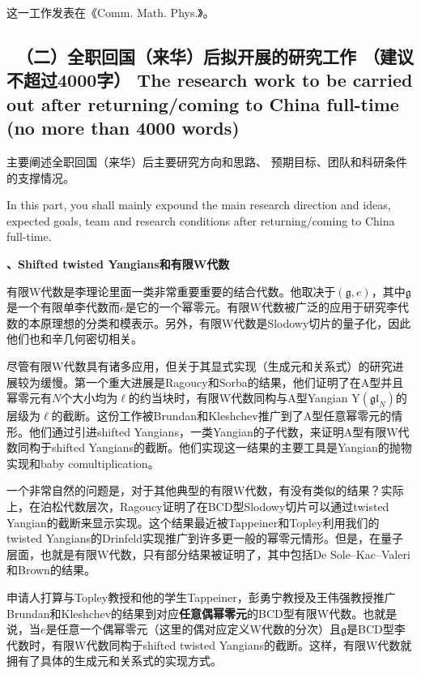 \documentclass[12pt,UTF8,AutoFakeBold=4,a4paper]{ctexart}
\begin{document}
这一工作发表在《Comm. Math. Phys.》。

{\color{MsBlue} \subsection{\sihao \kaishu \qquad \ 
\textbf{（二）全职回国（来华）后拟开展的研究工作} {\normalfont（建议不超过4000字）} 
\bfseries \xiaosihao {} 
The research work to 
be carried out after returning/coming to China full-time (no more than 4000 words)} 
}

 

{\sihao \color{MsBlue} \kaishu 主要阐述全职回国（来华）后主要研究方向和思路、
预期目标、团队和科研条件的支撑情况。}

\medskip

{\color{MsBlue}  
In this part, you shall mainly expound the main research direction and ideas, 
expected goals, team and research conditions after returning/coming to China 
full-time.}

\medskip

\textbf{、Shifted twisted Yangians和有限W代数}

有限W代数是李理论里面一类非常重要重要的结合代数。他取决于$(\mathfrak g,e)$，其中$\mathfrak g$是一个有限单李代数而$e$是它的一个幂零元。有限W代数被广泛的应用于研究李代数的本原理想的分类和模表示。另外，有限W代数是Slodowy切片的量子化，因此他们也和辛几何密切相关。

尽管有限W代数具有诸多应用，但关于其显式实现（生成元和关系式）的研究进展较为缓慢。第一个重大进展是Ragoucy和Sorba的结果，他们证明了在A型并且幂零元有$N$个大小均为$\ell$的约当块时，有限W代数同构与A型Yangian $\mathrm{Y}(\mathfrak{gl}_N)$的层级为$\ell$的截断。这份工作被Brundan和Kleshchev推广到了A型任意幂零元的情形。他们通过引进shifted Yangians，一类Yangian的子代数，来证明A型有限W代数同构于shifted Yangians的截断。他们实现这一结果的主要工具是Yangian的抛物实现和baby comultiplication。

一个非常自然的问题是，对于其他典型的有限W代数，有没有类似的结果？实际上，在泊松代数层次，Ragoucy证明了在BCD型Slodowy切片可以通过twisted Yangian的截断来显示实现。这个结果最近被Tappeiner和Topley利用我们的twisted Yangians的Drinfeld实现推广到许多更一般的幂零元情形。但是，在量子层面，也就是有限W代数，只有部分结果被证明了，其中包括De Sole–Kac–Valeri和Brown的结果。

申请人打算与Topley教授和他的学生Tappeiner，彭勇宁教授及王伟强教授推广Brundan和Kleshchev的结果到对应\textbf{任意偶幂零元}的BCD型有限W代数。也就是说，当$e$是任意一个偶幂零元（这里的偶对应定义W代数的分次）且$\mathfrak g$是BCD型李代数时，有限W代数同构于shifted twisted Yangians的截断。这样，有限W代数就拥有了具体的生成元和关系式的实现方式。
\end{document}
